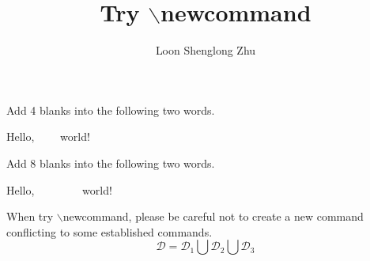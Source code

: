 \documentclass{article}
\title{Try $\backslash$newcommand}
\author{Loon Shenglong Zhu}
\newcommand{\blank}{\ \ \ \ }
\newcommand{\tb}{\blank\blank}
\newcommand{\ddd}{\mathcal{D}}
\begin{document}
\maketitle

Add 4 blanks into the following two words.

Hello, \blank world!

Add 8 blanks into the following two words.

Hello, \tb world!

When try $\backslash$newcommand, please be careful not to create a new command conflicting to some established commands.
\[\ddd = \ddd_1 \bigcup \ddd_2 \bigcup \ddd_3\]
\end{document}
